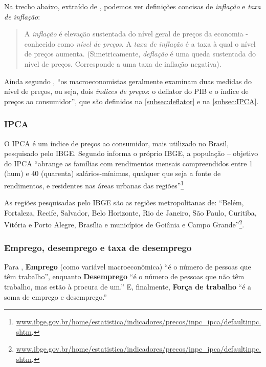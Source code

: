 \documentclass[]{article}
\let\rmarkdownfootnote\footnote%
\def\footnote{\protect\rmarkdownfootnote}
\begin{document}
Na trecho abaixo, extraído de , podemos ver
definições concisas de \emph{inflação} e \emph{taxa de inflação}:

\begin{quote}
A \emph{inflação} é elevação sustentada do nível geral de preços da
economia - conhecido como \emph{nível de preços}. A \emph{taxa de
inflação} é a taxa à qual o nível de preços aumenta. (Simetricamente,
\emph{deflação} é uma queda sustentada do nível de preços. Corresponde a
uma taxa de inflação negativa).
\end{quote}

Ainda segundo , ``os macroeconomistas
geralmente examinam duas medidas do nível de preços, ou seja, dois
\emph{índices de preços}: o deflator do PIB e o índice de preços ao
consumidor'', que são definidos na \autoref{subsec:deflator} e na
\autoref{subsec:IPCA}.

\subsubsection{IPCA}\label{subsec:IPCA}

O IPCA é um índice de preços ao consumidor, mais utilizado no Brasil,
pesquisado pelo IBGE. Segundo informa o próprio IBGE, a população --
objetivo do IPCA ``abrange as famílias com rendimentos mensais
compreendidos entre 1 (hum) e 40 (quarenta) salários-mínimos, qualquer
que seja a fonte de rendimentos, e residentes nas áreas urbanas das
regiões''\footnote{\href{http://www.ibge.gov.br/home/estatistica/indicadores/precos/inpc_ipca/defaultinpc.shtm}{www.ibge.gov.br/home/estatistica/indicadores/precos/inpc\_ipca/defaultinpc.shtm}.}

As regiões pesquisadas pelo IBGE são as regiôes metropolitanas de:
``Belém, Fortaleza, Recife, Salvador, Belo Horizonte, Rio de Janeiro,
São Paulo, Curitiba, Vitória e Porto Alegre, Brasília e municípios de
Goiânia e Campo Grande''\footnote{\href{http://www.ibge.gov.br/home/estatistica/indicadores/precos/inpc_ipca/defaultinpc.shtm}{www.ibge.gov.br/home/estatistica/indicadores/precos/inpc\_ipca/defaultinpc.shtm}.}.

\subsubsection{Emprego, desemprego e taxa de
desemprego}\label{emprego-desemprego-e-taxa-de-desemprego}

Para , \textbf{Emprego} (como variável
macroeconômica) ``é o número de pessoas que têm trabalho'', enquanto
\textbf{Desemprego} ``é o número de pessoas que não têm trabalho, mas
estão à procura de um.'' E, finalmente, \textbf{Força de trabalho} ``é a
soma de emprego e desemprego.''
\end{document}
